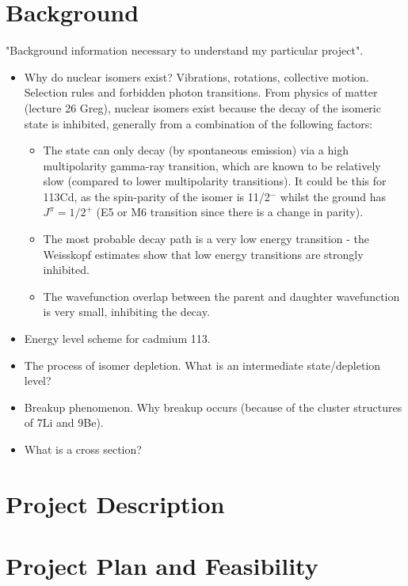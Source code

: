 \documentclass[12pt,a4paper]{article}
\begin{document}
\section*{Background}
"Background information necessary to understand my particular project".
\begin{itemize}
\item Why do nuclear isomers exist? Vibrations, rotations, collective motion. Selection rules and forbidden photon transitions. From physics of matter (lecture 26 Greg), nuclear isomers exist because the decay of the isomeric state is inhibited, generally from a combination of the following factors:
\begin{itemize}
\item The state can only decay (by spontaneous emission) via a high multipolarity gamma-ray transition, which are known to be relatively slow (compared to lower multipolarity transitions). It could be this for 113Cd, as the spin-parity of the isomer is 11/2$^-$ whilst the ground has $J^\pi = 1/2^+$ (E5 or M6 transition since there is a change in parity).
\item The most probable decay path is a very low energy transition - the Weisskopf estimates show that low energy transitions are strongly inhibited.
\item The wavefunction overlap between the parent and daughter wavefunction is very small, inhibiting the decay.
\end{itemize}
\item Energy level scheme for cadmium 113.
\item The process of isomer depletion. What is an intermediate state/depletion level? 
\item Breakup phenomenon. Why breakup occurs (because of the cluster structures of 7Li and 9Be).
\item What is a cross section?
\end{itemize}

\section*{Project Description}

\section*{Project Plan and Feasibility}


{}
\end{document}
